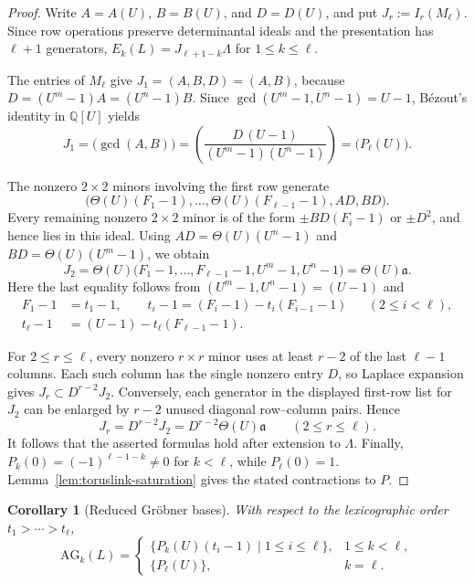 \documentclass{article}
\theoremstyle{definition}
\theoremstyle{plain}
\newtheorem{corollary}[definition]{Corollary}
\newcommand{\Q}{{\mathbb{Q}}}
\DeclareMathOperator{\gcdop}{gcd}
\newcommand{\AG}{\mathrm{AG}}
\begin{document}
\begin{proof}
Write \(A=A(U)\), \(B=B(U)\), and \(D=D(U)\), and put
\(J_r:=I_r(M_\ell)\).  Since row operations preserve determinantal ideals and the presentation has
\(\ell+1\) generators,
\(E_k(L)=J_{\ell+1-k}\Lambda\) for \(1\le k\le\ell\).

The entries of \(M_\ell\) give
\(J_1=(A,B,D)=(A,B)\), because
\(D=(U^m-1)A=(U^n-1)B\).  Since
\(\gcdop(U^m-1,U^n-1)=U-1\), B\'ezout's identity in \(\Q[U]\) yields
\[
 J_1=\bigl(\gcdop(A,B)\bigr)
 =\left(\frac{D\,(U-1)}{(U^m-1)(U^n-1)}\right)
 =\bigl(P_\ell(U)\bigr).
\]

The nonzero \(2\times2\) minors involving the first row generate
\[
 \bigl(\Theta(U)(F_1-1),\dots,\Theta(U)(F_{\ell-1}-1),AD,BD\bigr).
\]
Every remaining nonzero \(2\times2\) minor is of the form
\(\pm BD(F_i-1)\) or \(\pm D^2\), and hence lies in this ideal.
Using
\(AD=\Theta(U)(U^n-1)\) and \(BD=\Theta(U)(U^m-1)\), we obtain
\[
 J_2=\Theta(U)\bigl(F_1-1,\dots,F_{\ell-1}-1,U^m-1,U^n-1\bigr)
     =\Theta(U)\mathfrak a.
\]
Here the last equality follows from
\((U^m-1,U^n-1)=(U-1)\) and
\[
\begin{aligned}
 F_1-1&=t_1-1,\qquad
 t_i-1=(F_i-1)-t_i(F_{i-1}-1) &&(2\le i<\ell),\\
 t_\ell-1&=(U-1)-t_\ell(F_{\ell-1}-1).
\end{aligned}
\]

For \(2\le r\le\ell\), every nonzero \(r\times r\) minor uses at least
\(r-2\) of the last \(\ell-1\) columns.  Each such column has the single
nonzero entry \(D\), so Laplace expansion gives
\(J_r\subset D^{r-2}J_2\).  Conversely, each generator in the displayed
first-row list for \(J_2\) can be enlarged by \(r-2\) unused diagonal
row--column pairs.  Hence
\[
 J_r=D^{r-2}J_2=D^{r-2}\Theta(U)\mathfrak a
 \qquad(2\le r\le\ell).
\]
It follows that the asserted formulas hold after extension to
\(\Lambda\).  Finally,
\(P_k(0)=(-1)^{\ell-1-k}\ne0\) for \(k<\ell\), while
\(P_\ell(0)=1\).  Lemma~\ref{lem:toruslink-saturation} gives the stated
contractions to \(P\).
\end{proof}

\begin{corollary}[Reduced Gr\"obner bases]
\label{cor:toruslink-groebner}
With respect to the lexicographic order \(t_1>\cdots>t_\ell\),
\[
 \AG_k(L)=
 \begin{cases}
  \bigl\{P_k(U)(t_i-1)\mid 1\le i\le\ell\bigr\},&1\le k<\ell,\\
  \{P_\ell(U)\},&k=\ell.
 \end{cases}
\]
\end{corollary}
\end{document}
